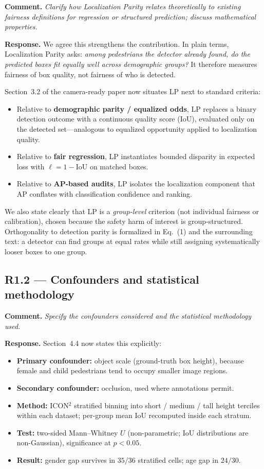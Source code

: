 \documentclass[11pt]{article}
\begin{document}
\textbf{Comment.}
\textit{Clarify how Localization Parity relates theoretically to existing
fairness definitions for regression or structured prediction; discuss
mathematical properties.}

\textbf{Response.}
We agree this strengthens the contribution. In plain terms, Localization Parity
asks: \emph{among pedestrians the detector already found, do the predicted boxes
fit equally well across demographic groups?} It therefore measures fairness of
box quality, not fairness of who is detected.

Section~3.2 of the camera-ready paper now situates LP next to standard criteria:
\begin{itemize}
\item Relative to \textbf{demographic parity / equalized odds}, LP replaces a
      binary detection outcome with a continuous quality score (IoU), evaluated
      only on the detected set---analogous to equalized opportunity applied to
      localization quality.
\item Relative to \textbf{fair regression}, LP instantiates bounded disparity
      in expected loss with $\ell = 1 - \mathrm{IoU}$ on matched boxes.
\item Relative to \textbf{AP-based audits}, LP isolates the localization
      component that AP conflates with classification confidence and ranking.
\end{itemize}
We also state clearly that LP is a \emph{group-level} criterion (not individual
fairness or calibration), chosen because the safety harm of interest is
group-structured. Orthogonality to detection parity is formalized in Eq.~(1)
and the surrounding text: a detector can find groups at equal rates while still
assigning systematically looser boxes to one group.

\subsection*{R1.2 --- Confounders and statistical methodology}

\textbf{Comment.}
\textit{Specify the confounders considered and the statistical methodology
used.}

\textbf{Response.}
Section~4.4 now states this explicitly:
\begin{itemize}
\item \textbf{Primary confounder:} object scale (ground-truth box height),
      because female and child pedestrians tend to occupy smaller image regions.
\item \textbf{Secondary confounder:} occlusion, used where annotations permit.
\item \textbf{Method:} ICON$^2$ stratified binning into short / medium / tall
      height terciles within each dataset; per-group mean IoU recomputed inside
      each stratum.
\item \textbf{Test:} two-sided Mann--Whitney $U$ (non-parametric; IoU
      distributions are non-Gaussian), significance at $p<0.05$.
\item \textbf{Result:} gender gap survives in $35/36$ stratified cells; age gap
      in $24/30$.
\end{itemize}
\end{document}
